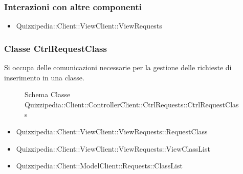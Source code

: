 \subsubsection{Interazioni con altre componenti}
\begin{itemize}
\item Quizzipedia::Client::ViewClient::ViewRequests
\end{itemize}
\subsubsection{Classe CtrlRequestClass}
Si occupa delle comunicazioni necessarie per la gestione delle richieste di inserimento in una classe.
\begin{figure}[H]
\centering
\noindent{}
\caption[Schema Classe CtrlRequestClass]{Schema Classe Quizzipedia::Client::ControllerClient::CtrlRequests::CtrlRequestClass}
\end{figure}
\begin{itemize}
\item Quizzipedia::Client::ViewClient::ViewRequests::RequestClass
\item Quizzipedia::Client::ViewClient::ViewRequests::ViewClassList
\end{itemize}
\begin{itemize}
\item Quizzipedia::Client::ModelClient::Requests::ClassList
\end{itemize}
